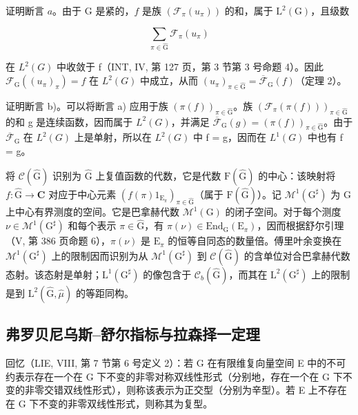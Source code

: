证明断言 \(a\)。由于 G 是紧的，\(f\) 是族 \((\mathcal{F}_{\pi}(u_{\pi}))\) 的和，属于 \(\mathrm{L}^2 (\mathrm{G})\)，且级数

\[
\sum_ {\pi \in \widehat {\mathrm{G}}} \mathcal {F} _ {\pi} (u _ {\pi})
\]

在 \(L^{2}(G)\) 中收敛于 f（INT, IV, 第 127 页，第 3 节第 3 号命题 4）。因此 \(\mathcal{F}_{\mathrm{G}}((u_{\pi})_{\pi}) = f\) 在 \(L^{2}(G)\) 中成立，从而 \((u_{\pi})_{\pi \in \widehat{\mathrm{G}}} = \overline{\mathcal{F}}_{\mathrm{G}}(f)\)（定理 2）。

证明断言 b)。可以将断言 a) 应用于族 \((\pi(f))_{\pi \in \widehat{\mathrm{G}}}\)。族 \((\mathcal{F}_{\pi}(\pi(f)))_{\pi \in \widehat{\mathrm{G}}}\) 的和 g 是连续函数，因而属于 \(L^{2}(G)\)，并满足 \(\overline{\mathcal{F}}_{\mathrm{G}}(g) = (\pi(f))_{\pi \in \widehat{\mathrm{G}}}\)。由于 \(\overline{\mathcal{F}}_{\mathrm{G}}\) 在 \(L^{2}(G)\) 上是单射，所以在 \(L^{2}(G)\) 中 f = g，因而在 \(L^{1}(G)\) 中也有 f = g。

将 \(\mathcal{C}(\widehat{\mathrm{G}})\) 识别为 \(\widehat{\mathrm{G}}\) 上复值函数的代数，它是代数 \(\mathrm{F}(\widehat{\mathrm{G}})\) 的中心：该映射将 \(f\colon \widehat{\mathrm{G}}\to \mathbf{C}\) 对应于中心元素 \((f(\pi)1_{\mathrm{E}_{\pi}})_{\pi \in \widehat{\mathrm{G}}}\)（属于 \(\mathrm{F}(\widehat{\mathrm{G}})\)）。记 \(\mathcal{M}^1 (\mathrm{G}^\sharp)\) 为 G 上中心有界测度的空间。它是巴拿赫代数 \(\mathcal{M}^1 (\mathrm{G})\) 的闭子空间。对于每个测度 \(\nu \in \mathcal{M}^1 (\mathrm{G}^\sharp)\) 和每个表示 \(\pi \in \widehat{\mathrm{G}}\)，有 \(\pi (\nu)\in \mathrm{End}_{\mathrm{G}}(\mathrm{E}_{\pi})\)，因而根据舒尔引理（V, 第 386 页命题 6），\(\pi (\nu)\) 是 \(\mathrm{E}_{\pi}\) 的恒等自同态的数量倍。傅里叶余变换在 \(\mathcal{M}^1 (\mathrm{G}^\sharp)\) 上的限制因而识别为从 \(\mathcal{M}^1 (\mathrm{G}^\sharp)\) 到 \(\mathcal{C}(\widehat{\mathrm{G}})\) 的含单位对合巴拿赫代数态射。该态射是单射；\(\mathrm{L}^1 (\mathrm{G}^\sharp)\) 的像包含于 \(\mathcal{C}_b(\widehat{\mathrm{G}})\)，而其在 \(\mathrm{L}^2 (\mathrm{G}^\sharp)\) 上的限制是到 \(\mathrm{L}^2 (\widehat{\mathrm{G}},\widehat{\mu})\) 的等距同构。

\subsection{弗罗贝尼乌斯--舒尔指标与拉森择一定理}

回忆（LIE, VIII, 第 7 节第 6 号定义 2）：若 G 在有限维复向量空间 E 中的不可约表示存在一个在 G 下不变的非零对称双线性形式（分别地，存在一个在 G 下不变的非零交错双线性形式），则称该表示为正交型（分别为辛型）。若 E 上不存在在 G 下不变的非零双线性形式，则称其为复型。

